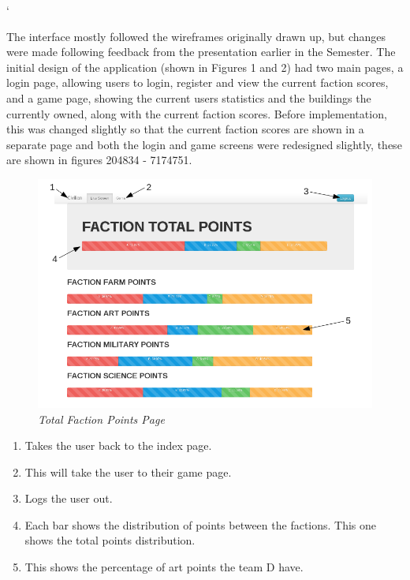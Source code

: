 `\documentclass{sig-alt-release2}
\begin{document}
The interface mostly followed the wireframes originally drawn up, but changes were made following feedback from the presentation earlier in the Semester. The initial design of the application (shown in Figures 1 and 2) had two main pages, a login page, allowing users to login, register and view the current faction scores, and a game page, showing the current users statistics and the buildings the currently owned, along with the current faction scores. Before implementation, this was changed slightly so that the current faction scores are shown in a separate page and both the login and game screens were redesigned slightly, these are shown in figures 204834 - 7174751.\\

\begin{figure}[!htbp]
  \caption{\textit{Total Faction Points Page}}
  \begin{center}
		\includegraphics[scale=0.30]{img/factionlabel.png}
  \end{center}
\end{figure}


\begin{enumerate}
\item Takes the user back to the index page. 
\item This will take the user to their game page.
\item Logs the user out.
\item Each bar shows the distribution of points between the factions. This one shows the total points distribution.
\item This shows the percentage of art points the team D have.
\end{enumerate}
\end{document}
